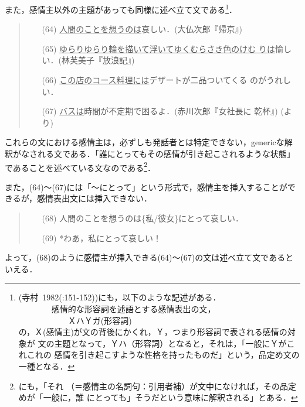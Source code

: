 また，感情主以外の主題があっても同様に述べ立て文である\footnote{(寺村~1982(:151-152))にも，以下のような記述がある．\\
　　　　感情的な形容詞を述語とする感情表出の文，\\
　　　　　　ＸハＹガ(形容詞)\\
の，Ｘ(感情主)が文の背後にかくれ，Ｙ，つまり形容詞で表される感情の対象が
文の主題となって，Ｙハ（形容詞）となると，それは，「一般にＹがこれこれの
感情を引き起こすような性格を持ったものだ」という，品定め文の一種となる．}．

\vspace{0.3cm}
\begin{quote}
\begin{itemize}
 \item[(64)] \underline{人間のことを想うのは}哀しい．(大仏次郎『帰京』)
 \item[(65)] \underline{ゆらりゆらり輪を描いて浮いてゆくむらさき色のけむ
	     りは}愉しい．(林芙美子『放浪記』)
 \item[(66)] \underline{この店のコース料理には}デザートが二品ついてくる
	     のがうれしい．
 \item[(67)] \underline{バスは}時間が不定期で困るよ．(赤川次郎『女社長に
	     乾杯』) (\cite{山岡1997}より)
\end{itemize}
\end{quote}
\vspace{0.3cm}

これらの文における感情主は，必ずしも発話者とは特定できない，genericな解
釈がなされる文である．「誰にとってもその感情が引き起こされるような状態」
であることを述べている文なのである\footnote{\cite{寺村1982}にも，「それ
（＝感情主の名詞句：引用者補）が文中になければ，その品定めが「一般に，誰
にとっても」そうだという意味に解釈される」とある．}．

また，(64)〜(67)には「〜にとって」という形式で，感情主を挿入することがで
きるが，感情表出文には挿入できない．

\vspace{0.3cm}
\begin{quote}
\begin{itemize}
 \item[(68)] 人間のことを想うのは\{私/彼女\}にとって哀しい．
 \item[(69)] *わあ，私にとって哀しい！
\end{itemize}
\end{quote}
\vspace{0.3cm}

よって，(68)のように感情主が挿入できる(64)〜(67)の文は述べ立て文であると
いえる．

